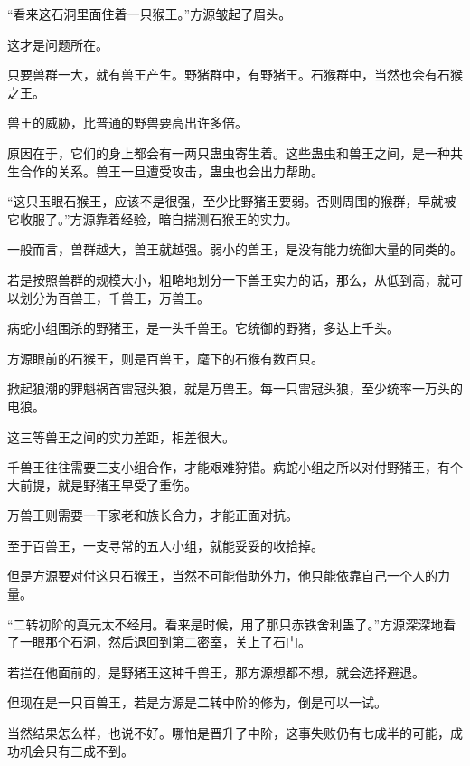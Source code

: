 \begin{this_body}
“看来这石洞里面住着一只猴王。”方源皱起了眉头。

这才是问题所在。

只要兽群一大，就有兽王产生。野猪群中，有野猪王。石猴群中，当然也会有石猴之王。

兽王的威胁，比普通的野兽要高出许多倍。

原因在于，它们的身上都会有一两只蛊虫寄生着。这些蛊虫和兽王之间，是一种共生合作的关系。兽王一旦遭受攻击，蛊虫也会出力帮助。

“这只玉眼石猴王，应该不是很强，至少比野猪王要弱。否则周围的猴群，早就被它收服了。”方源靠着经验，暗自揣测石猴王的实力。

一般而言，兽群越大，兽王就越强。弱小的兽王，是没有能力统御大量的同类的。

若是按照兽群的规模大小，粗略地划分一下兽王实力的话，那么，从低到高，就可以划分为百兽王，千兽王，万兽王。

病蛇小组围杀的野猪王，是一头千兽王。它统御的野猪，多达上千头。

方源眼前的石猴王，则是百兽王，麾下的石猴有数百只。

掀起狼潮的罪魁祸首雷冠头狼，就是万兽王。每一只雷冠头狼，至少统率一万头的电狼。

这三等兽王之间的实力差距，相差很大。

千兽王往往需要三支小组合作，才能艰难狩猎。病蛇小组之所以对付野猪王，有个大前提，就是野猪王早受了重伤。

万兽王则需要一干家老和族长合力，才能正面对抗。

至于百兽王，一支寻常的五人小组，就能妥妥的收拾掉。

但是方源要对付这只石猴王，当然不可能借助外力，他只能依靠自己一个人的力量。

“二转初阶的真元太不经用。看来是时候，用了那只赤铁舍利蛊了。”方源深深地看了一眼那个石洞，然后退回到第二密室，关上了石门。

若拦在他面前的，是野猪王这种千兽王，那方源想都不想，就会选择避退。

但现在是一只百兽王，若是方源是二转中阶的修为，倒是可以一试。

当然结果怎么样，也说不好。哪怕是晋升了中阶，这事失败仍有七成半的可能，成功机会只有三成不到。

\end{this_body}

